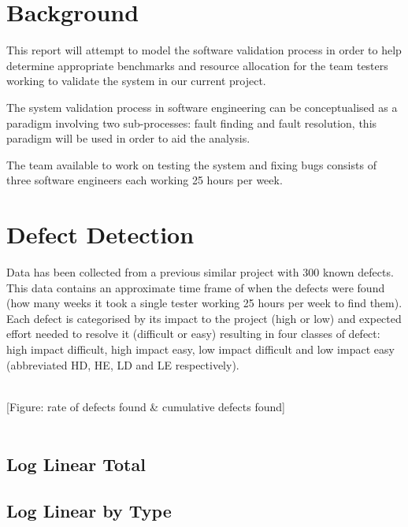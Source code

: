 \documentclass{article}
\begin{document}
	\maketitle

	\section{Background}

	This report will attempt to model the software validation process in order to help determine appropriate benchmarks and resource allocation for the team testers working to validate the system in our current project.
	
	The system validation process in software engineering can be conceptualised as a paradigm involving two sub-processes: fault finding and fault resolution, this paradigm will be used in order to aid the analysis.
	
	The team available to work on testing the system and fixing bugs consists of three software engineers each working 25 hours per week.
	
	

	
	\section{Defect Detection}
		Data has been collected from a previous similar project with 300 known defects.
		This data contains an approximate time frame of when the defects were found (how many weeks it took a single tester working 25 hours per week to find them). Each defect is categorised by its impact to the project (high or low) and expected effort needed to resolve it (difficult or easy) resulting in four classes of defect: high impact difficult, high impact easy, low impact difficult and low impact easy (abbreviated HD, HE, LD and LE respectively).
		
		
		\ \\
		
		[Figure: rate of defects found \& cumulative defects found]\\
		
		\ \\
		
		
		
		\subsection{Log Linear Total}
		
		
		\subsection{Log Linear by Type}
		
\end{document}
